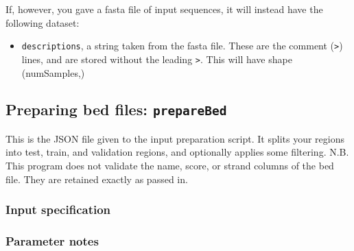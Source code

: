 \documentclass{article}
\begin{document}
If, however, you gave a fasta file of input sequences, it will instead have the
following dataset:

\begin{itemize}
    \item \texttt{descriptions}, a string taken from the fasta file.
        These are the comment (\texttt{>}) lines, and are stored without the
        leading \texttt{>}.
        This will have shape (numSamples,)

\end{itemize}

\newpage

\subsection{Preparing bed files: \texttt{prepareBed}}\label{prog:prepareBed}

This is the JSON file given to the input preparation script.
It splits your regions into test, train, and validation regions, and optionally
applies some filtering.
N.B. This program does not validate the name, score, or strand columns of the
bed file.
They are retained exactly as passed in.

\subsubsection{Input specification}



\subsubsection{Parameter notes}
\end{document}
